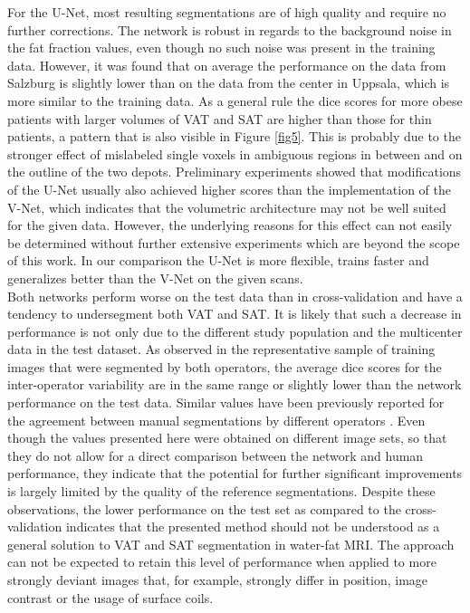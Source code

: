 \documentclass[10pt,letterpaper]{article}
\begin{document}
	For the U-Net, most resulting segmentations are of high quality and require no further corrections. The network is robust in regards to the background noise in the fat fraction values, even though no such noise was present in the training data. However, it was found that on average the performance on the data from Salzburg is slightly lower than on the data from the center in Uppsala, which is more similar to the training data. As a general rule the dice scores for more obese patients with larger volumes of VAT and SAT are higher than those for thin patients, a pattern that is also visible in Figure \ref{fig5}. This is probably due to the stronger effect of mislabeled single voxels in ambiguous regions in between and on the outline of the two depots. Preliminary experiments showed that modifications of the U-Net usually also achieved higher scores than the implementation of the V-Net, which indicates that the volumetric architecture may not be well suited for the given data. However, the underlying reasons for this effect can not easily be determined without further extensive experiments which are beyond the scope of this work. In our comparison the U-Net is more flexible, trains faster and generalizes better than the V-Net on the given scans. \\

	Both networks perform worse on the test data than in cross-validation and have a tendency to undersegment both VAT and SAT. It is likely that such a decrease in performance is not only due to the different study population and the multicenter data in the test dataset. As observed in the representative sample of training images that were segmented by both operators, the average dice scores for the inter-operator variability are in the same range or slightly lower than the network performance on the test data. Similar values have been previously reported for the agreement between manual segmentations by different operators \cite{joshi2013automatic}. Even though the values presented here were obtained on different image sets, so that they do not allow for a direct comparison between the network and human performance, they indicate that the potential for further significant improvements is largely limited by the quality of the reference segmentations.
	Despite these observations, the lower performance on the test set as compared to the cross-validation indicates that the presented method should not be understood as a general solution to VAT and SAT segmentation in water-fat MRI. The approach can not be expected to retain this level of performance when applied to more strongly deviant images that, for example, strongly differ in position, image contrast or the usage of surface coils.
\end{document}
